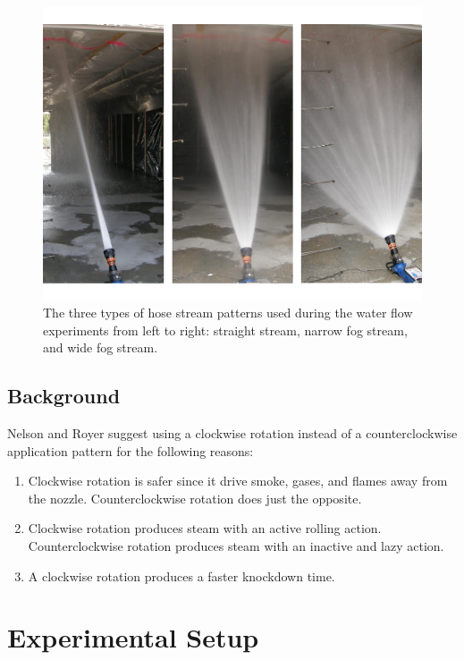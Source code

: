 \documentclass[12pt,oneside]{book}
\begin{document}
\begin{figure}[!ht]
\includegraphics[width=6in]{../Pictures/hose_streams.pdf}
\caption[Different Hose Stream Patterns]{The three types of hose stream patterns used during the water flow experiments from left to right: straight stream, narrow fog stream, and wide fog stream.}
\label{fig:hose_streams}
\end{figure}
\FloatBarrier

\section{Background}
\label{sec:Background}
Nelson and Royer suggest using a clockwise rotation instead of a counterclockwise application pattern for the following reasons:
\begin{enumerate} 
\item Clockwise rotation is safer since it drive smoke, gases, and flames away from the nozzle.
Counterclockwise rotation does just the opposite.
\item Clockwise rotation produces steam with an active rolling action. Counterclockwise rotation
produces steam with an inactive and lazy action.
\item A clockwise rotation produces a faster knockdown time.
\end{enumerate}

\chapter{Experimental Setup}
\label{chap:Experimental_Setup}
\end{document}
